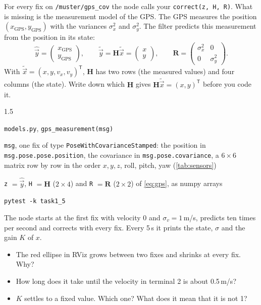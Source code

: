 \documentclass[11pt,a4paper,parskip=half]{scrartcl}
\newcommand{\thema}[1]{\texttt{#1}}
\newcommand{\datei}[1]{\texttt{#1}}
\newcommand{\mat}[1]{\mathbf{#1}}
\newcommand{\T}{^{\mathsf{T}}}
\newcommand{\todorow}[2]{\par\noindent\raggedright\hangindent=1.6cm\hangafter=1\makebox[1.6cm][l]{\color{ohmgrey}#1}#2\par}
\newcommand{\where}[1]{\todorow{where}{#1}}
\newcommand{\given}[1]{\todorow{given}{#1}}
\newcommand{\result}[1]{\todorow{write}{#1}}
\newcommand{\test}[1]{\todorow{test}{#1}}
\begin{document}
For every fix on \thema{/muster/gps\_cov} the node calls your \thema{correct(z, H, R)}. What is missing is the
measurement model of the GPS. The GPS measures the position \((x_\text{GPS}, y_\text{GPS})\) with the variances
\(\sigma_x^2\) and \(\sigma_y^2\). The filter predicts this measurement from the position in its state:
\begin{equation}
  \hat{\vec y} = \begin{pmatrix} x_\text{GPS} \\ y_\text{GPS} \end{pmatrix} , \qquad
  \tilde{\vec y} = \mat H \tilde{\vec x} = \begin{pmatrix} x \\ y \end{pmatrix} , \qquad
  \mat R = \begin{pmatrix} \sigma_x^2 & 0 \\ 0 & \sigma_y^2 \end{pmatrix} .
  \label{eq:gps}
\end{equation}
With \(\tilde{\vec x} = (x, y, v_x, v_y)\T\), \(\mat H\) has two rows (the measured values) and four columns (the
state). Write down which \(\mat H\) gives \(\mat H \tilde{\vec x} = (x, y)\T\) before you code it.

\begin{todo}{1.5}
\where{\datei{models.py}, \thema{gps\_measurement(msg)}}
\given{\thema{msg}, one fix of type \thema{PoseWithCovarianceStamped}: the position in
       \thema{msg.pose.pose.position}, the covariance in \thema{msg.pose.covariance}, a \(6 \times 6\) matrix row
       by row in the order \(x, y, z\), roll, pitch, yaw (\cref{tab:sensors})}
\result{\thema{z} \(= \hat{\vec y}\), \thema{H} \(= \mat H\) (\(2 \times 4\)) and \thema{R} \(= \mat R\)
       (\(2 \times 2\)) of \cref{eq:gps}, as numpy arrays}
\test{\thema{pytest -k task1\_5}}
\end{todo}

The node starts at the first fix with velocity 0 and \(\sigma_v = 1\)\,m/s, predicts ten times per second and
corrects with every fix. Every 5\,s it prints the state, \(\sigma\) and the gain \(K\) of \(x\).
\begin{itemize}
  \item The red ellipse in RViz grows between two fixes and shrinks at every fix. Why?
  \item How long does it take until the velocity in terminal 2 is about 0.5\,m/s?
  \item \(K\) settles to a fixed value. Which one? What does it mean that it is not 1?
\end{itemize}
\end{document}
